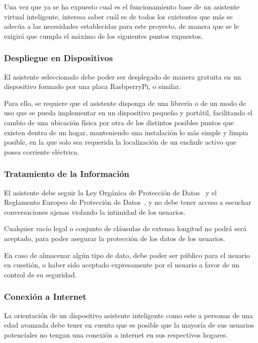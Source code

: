 Una vez que ya se ha expuesto cual es el funcionamiento base de un asistente virtual inteligente, interesa saber cuál es de todos los existentes que más se adecúa a las necesidades establecidas para este proyecto, de manera que se le exigirá que cumpla el máximo de los siguientes puntos expuestos.

\subsubsection{Despliegue en Dispositivos}

El asistente seleccionado debe poder ser desplegado de manera gratuita en un dispositivo formado por una placa RasbperryPi, o similar.

Para ello, se requiere que el asistente disponga de una librería o de un modo de uso que se pueda implementar en un dispositivo pequeño y portátil, facilitando el cambio de una ubicación física por otra de los distintos posibles puntos que existen dentro de un hogar, manteniendo una instalación lo más simple y limpia posible, en la que solo sea requerida la localización de un enchufe activo que posea corriente eléctrica.

\subsubsection{Tratamiento de la Información}

El asistente debe seguir la Ley Orgánica de Protección de Datos~\cite{lopd} y el Reglamento Europeo de Protección de Datos~\cite{rgpd}, y no debe tener acceso a escuchar conversaciones ajenas violando la intimidad de los usuarios.

Cualquier vacío legal o conjunto de cláusulas de extensa longitud no podrá será aceptado, para poder asegurar la protección de los datos de los usuarios.

En caso de almacenar algún tipo de dato, debe poder ser público para el usuario en cuestión, o haber sido aceptado expresamente por el usuario a favor de un control de su seguridad.

\subsubsection{Conexión a Internet}

La orientación de un dispositivo asistente inteligente como este a personas de una edad avanzada debe tener en cuenta que es posible que la mayoría de sus usuarios potenciales no tengan una conexión a internet en sus respectivos hogares.

